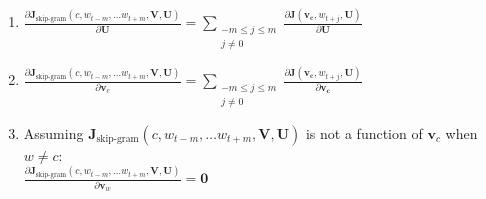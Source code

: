 \begin{enumerate}
  [label=(\roman*)]
  \item ${\frac{\partial \bm J_{\textrm{skip-gram}}(c, w_{t-m},\ldots w_{t+m}, \bm V, \bm U)} {\partial \bm U}} = \sum_{\substack{-m \le j \le m \\ j \ne 0}} \frac{\partial \bm{J} (\bm{v_c},w_{t+j},\bm{U})}{\partial \bm{U}}  $
  \item ${\frac{\partial \bm J_{\textrm{skip-gram}}(c, w_{t-m},\ldots w_{t+m}, \bm V, \bm U)} {\partial \bm v_c}} = \sum_{\substack{-m \le j \le m \\ j \ne 0}} \frac{\partial \bm{J} (\bm{v_c},w_{t+j},\bm{U})}{\partial \bm{v_c}}  $
  \item Assuming $\bm J_{\textrm{skip-gram}}(c, w_{t-m},\ldots w_{t+m}, \bm V, \bm U)$ is not a function of $\bm v_c$ when $w \ne c$: \\
   ${\frac{\partial \bm J_{\textrm{skip-gram}}(c, w_{t-m},\ldots w_{t+m}, \bm V, \bm U)} {\partial \bm v_w}} = \bm 0$ 
\end{enumerate}
